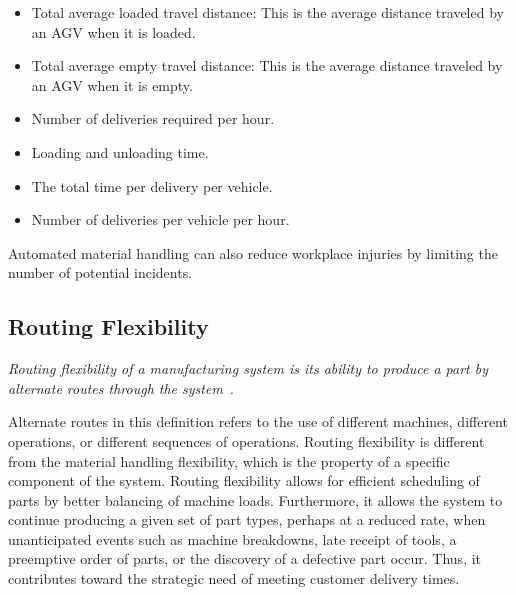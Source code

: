 \begin{itemize}
\begin{itemize}
 \item Total average loaded travel distance: This is the average distance traveled by an AGV when it is loaded.
 \item Total average empty travel distance: This is the average distance traveled by an AGV when it is empty.
 \item Number of deliveries required per hour.
 \item Loading and unloading time.
 \item The total time per delivery per vehicle.
 \item Number of deliveries per vehicle per hour.
\end{itemize}
\end{itemize}

Automated material handling can also reduce workplace injuries by limiting the number of potential incidents.

\subsection{Routing Flexibility}
\emph{Routing flexibility of a manufacturing system is its ability to produce a part by alternate routes through the system}~\cite{Sethi.1990}.

Alternate routes in this definition refers to the use of different machines, different operations, or different sequences of operations. Routing flexibility is different from the material handling flexibility, which is the property of a specific component of the system. Routing flexibility allows for efficient scheduling of parts by better balancing of machine loads. Furthermore, it allows the system to continue producing a given set of part types, perhaps at a reduced rate, when unanticipated events such as machine breakdowns, late receipt of tools, a preemptive order of parts, or the discovery of a defective part occur. Thus, it contributes toward the strategic need of meeting customer delivery times.

